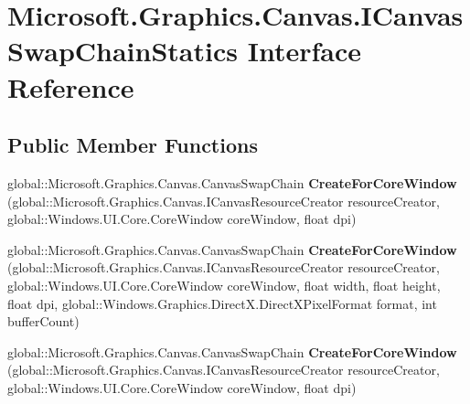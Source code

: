 \hypertarget{interface_microsoft_1_1_graphics_1_1_canvas_1_1_i_canvas_swap_chain_statics}{}\section{Microsoft.\+Graphics.\+Canvas.\+I\+Canvas\+Swap\+Chain\+Statics Interface Reference}
\label{interface_microsoft_1_1_graphics_1_1_canvas_1_1_i_canvas_swap_chain_statics}
\subsection*{Public Member Functions}
\begin{DoxyCompactItemize}
\item 
\mbox{\label{interface_microsoft_1_1_graphics_1_1_canvas_1_1_i_canvas_swap_chain_statics_a6a0db7b5454320836bd36df271776cea}} 
global\+::\+Microsoft.\+Graphics.\+Canvas.\+Canvas\+Swap\+Chain {\bfseries Create\+For\+Core\+Window} (global\+::\+Microsoft.\+Graphics.\+Canvas.\+I\+Canvas\+Resource\+Creator resource\+Creator, global\+::\+Windows.\+U\+I.\+Core.\+Core\+Window core\+Window, float dpi)
\item 
\mbox{\label{interface_microsoft_1_1_graphics_1_1_canvas_1_1_i_canvas_swap_chain_statics_afb12532100a3740af7bfec62008c5172}} 
global\+::\+Microsoft.\+Graphics.\+Canvas.\+Canvas\+Swap\+Chain {\bfseries Create\+For\+Core\+Window} (global\+::\+Microsoft.\+Graphics.\+Canvas.\+I\+Canvas\+Resource\+Creator resource\+Creator, global\+::\+Windows.\+U\+I.\+Core.\+Core\+Window core\+Window, float width, float height, float dpi, global\+::\+Windows.\+Graphics.\+Direct\+X.\+Direct\+X\+Pixel\+Format format, int buffer\+Count)
\item 
\mbox{\label{interface_microsoft_1_1_graphics_1_1_canvas_1_1_i_canvas_swap_chain_statics_a6a0db7b5454320836bd36df271776cea}} 
global\+::\+Microsoft.\+Graphics.\+Canvas.\+Canvas\+Swap\+Chain {\bfseries Create\+For\+Core\+Window} (global\+::\+Microsoft.\+Graphics.\+Canvas.\+I\+Canvas\+Resource\+Creator resource\+Creator, global\+::\+Windows.\+U\+I.\+Core.\+Core\+Window core\+Window, float dpi)

\end{DoxyCompactItemize}
